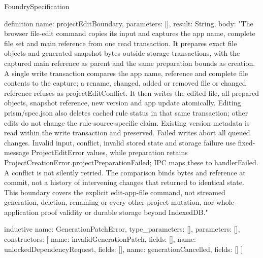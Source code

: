 \begin{lexlean}{FoundrySpecification}
\begin{semanticmodule}
definition{
  name: projectEditBoundary,
  parameters: [],
  result: String,
  body: "The browser file-edit command copies its input and captures the app name, complete file set and main reference from one read transaction. It prepares exact file objects and generated snapshot bytes outside storage transactions, with the captured main reference as parent and the same preparation bounds as creation. A single write transaction compares the app name, reference and complete file contents to the capture; a rename, changed, added or removed file or changed reference refuses as projectEditConflict. It then writes the edited file, all prepared objects, snapshot reference, new version and app update atomically. Editing prism/spec.json also deletes cached rule status in that same transaction; other edits do not change the rule-source-specific claim. Existing version metadata is read within the write transaction and preserved. Failed writes abort all queued changes. Invalid input, conflict, invalid stored state and storage failure use fixed-message ProjectEditError values, while preparation retains ProjectCreationError.projectPreparationFailed; IPC maps these to handlerFailed. A conflict is not silently retried. The comparison binds bytes and reference at commit, not a history of intervening changes that returned to identical state. This boundary covers the explicit edit-app-file command, not streamed generation, deletion, renaming or every other project mutation, nor whole-application proof validity or durable storage beyond IndexedDB."
}

inductive{
  name: GenerationPatchError,
  type_parameters: [],
  parameters: [],
  constructors: [
    {name: invalidGenerationPatch, fields: []},
    {name: unlockedDependencyRequest, fields: []},
    {name: generationCancelled, fields: []}
  ]
}


\end{semanticmodule}
\end{lexlean}
